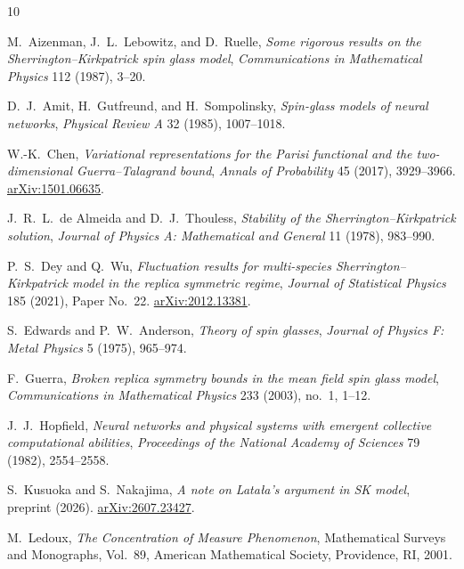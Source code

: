 \documentclass[11pt]{article}
\numberwithin{equation}{section}
\newcommand{\1}{\mathbf 1}
\begin{document}
\begin{thebibliography}{10}

M.~Aizenman, J.~L.~Lebowitz, and D.~Ruelle,
\newblock
\emph{Some rigorous results on the Sherrington--Kirkpatrick spin glass model},
\newblock \emph{Communications in Mathematical Physics} 112 (1987), 3--20.

D.~J.~Amit, H.~Gutfreund, and H.~Sompolinsky,
\newblock
\emph{Spin-glass models of neural networks},
\newblock \emph{Physical Review A} 32 (1985), 1007--1018.

W.-K.~Chen,
\newblock
\emph{Variational representations for the Parisi functional and the
two-dimensional Guerra--Talagrand bound},
\newblock \emph{Annals of Probability} 45 (2017), 3929--3966.
\href{https://arxiv.org/abs/1501.06635}{arXiv:1501.06635}.

J.~R.~L.~de Almeida and D.~J.~Thouless,
\newblock
\emph{Stability of the Sherrington--Kirkpatrick solution},
\newblock \emph{Journal of Physics A: Mathematical and General} 11 (1978),
983--990.

P.~S.~Dey and Q.~Wu,
\newblock
\emph{Fluctuation results for multi-species
Sherrington--Kirkpatrick model in the replica symmetric regime},
\newblock \emph{Journal of Statistical Physics} 185 (2021),
Paper No.~22.
\href{https://arxiv.org/abs/2012.13381}{arXiv:2012.13381}.

S.~Edwards and P.~W.~Anderson,
\newblock
\emph{Theory of spin glasses},
\newblock \emph{Journal of Physics F: Metal Physics} 5 (1975), 965--974.

F.~Guerra,
\newblock
\emph{Broken replica symmetry bounds in the mean field spin glass model},
\newblock \emph{Communications in Mathematical Physics} 233 (2003),
no.~1, 1--12.

J.~J.~Hopfield,
\newblock
\emph{Neural networks and physical systems with emergent collective
computational abilities},
\newblock \emph{Proceedings of the National Academy of Sciences} 79 (1982),
2554--2558.

S.~Kusuoka and S.~Nakajima,
\newblock
\emph{A note on Lata{\l}a's argument in SK model},
\newblock preprint (2026).
\href{https://arxiv.org/abs/2607.23427}{arXiv:2607.23427}.

M.~Ledoux,
\newblock
\emph{The Concentration of Measure Phenomenon},
\newblock Mathematical Surveys and Monographs, Vol.~89,
American Mathematical Society, Providence, RI, 2001.


\end{thebibliography}
\end{document}
